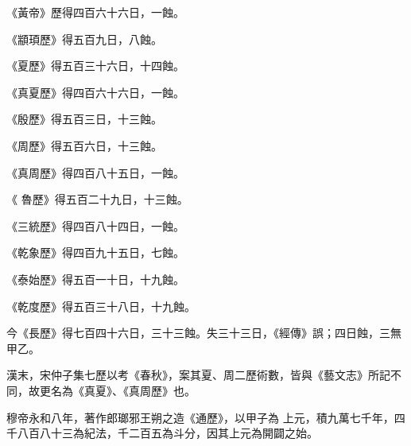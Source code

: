 \begin{pinyinscope}
 《黃帝》歷得四百六十六日，一蝕。



 《顓頊歷》得五百九日，八蝕。



 《夏歷》得五百三十六日，十四蝕。



 《真夏歷》得四百六十六日，一蝕。



 《殷歷》得五百三日，十三蝕。



 《周歷》得五百六日，十三蝕。



 《真周歷》得四百八十五日，一蝕。



 《
 魯歷》得五百二十九日，十三蝕。



 《三統歷》得四百八十四日，一蝕。



 《乾象歷》得四百九十五日，七蝕。



 《泰始歷》得五百一十日，十九蝕。



 《乾度歷》得五百三十八日，十九蝕。



 今《長歷》得七百四十六日，三十三蝕。失三十三日，《經傳》誤；四日蝕，三無甲乙。



 漢末，宋仲子集七歷以考《春秋》，案其夏、周二歷術數，皆與《藝文志》所記不同，故更名為《真夏》、《真周歷》也。



 穆帝永和八年，著作郎瑯邪王朔之造《通歷》，以甲子為
 上元，積九萬七千年，四千八百八十三為紀法，千二百五為斗分，因其上元為開闢之始。




\end{pinyinscope}

